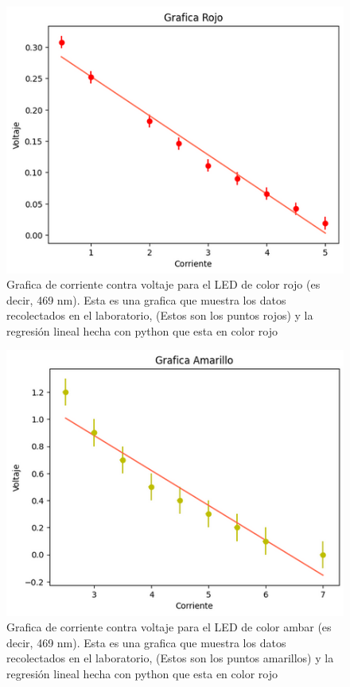 \documentclass[a4paper, amsfonts, amssymb, amsmath, reprint, showkeys, nofootinbib, twoside]{revtex4-1}
\begin{document}
\begin{figure}[H]
   \centering
   \includegraphics[scale=0.3]{Grafica_Rojo.png}
   \caption{Grafica de corriente contra voltaje para el LED de color rojo (es decir, 469 nm). Esta es una grafica que muestra los datos recolectados en el laboratorio, (Estos son los puntos rojos) y la regresión lineal hecha con python que esta en color rojo}
\end{figure}
\begin{figure}[H]
   \centering
   \includegraphics[scale=0.3]{Grafica_Amarillo.png}
   \caption{Grafica de corriente contra voltaje para el LED de color ambar (es decir, 469 nm). Esta es una grafica que muestra los datos recolectados en el laboratorio, (Estos son los puntos amarillos) y la regresión lineal hecha con python que esta en color rojo}
\end{figure}
\end{document}

